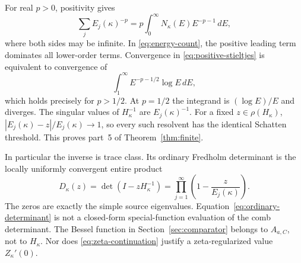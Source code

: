 For real $p>0$, positivity gives
\begin{equation}
\sum_jE_j(\kappa)^{-p}
=p\int_0^\infty N_\kappa(E)E^{-p-1}\,dE,
\label{eq:positive-stieltjes}
\end{equation}
where both sides may be infinite.
In \eqref{eq:energy-count}, the positive leading term
dominates all lower-order terms.
Convergence in \eqref{eq:positive-stieltjes} is equivalent
to convergence of
\[
\int_1^\infty E^{-p-1/2}\log E\,dE,
\]
which holds precisely for $p>1/2$.
At $p=1/2$ the integrand is $(\log E)/E$ and diverges.
The singular values of $H_\kappa^{-1}$ are
$E_j(\kappa)^{-1}$.
For a fixed $z\in\rho(H_\kappa)$,
$|E_j(\kappa)-z|/E_j(\kappa)\to1$,
so every such resolvent has the identical Schatten threshold.
This proves part~5 of Theorem~\ref{thm:finite}.

In particular the inverse is trace class.
Its ordinary Fredholm determinant is the locally uniformly
convergent entire product
\begin{equation}
D_\kappa(z)=\det(I-zH_\kappa^{-1})
           =\prod_{j=1}^\infty
                    \left(1-\frac{z}{E_j(\kappa)}\right).
\label{eq:ordinary-determinant}
\end{equation}
The zeros are exactly the simple source eigenvalues.
Equation~\eqref{eq:ordinary-determinant} is not a closed-form
special-function evaluation of the comb determinant.
The Bessel function in Section~\ref{sec:comparator}
belongs to $A_{a,C}$, not to $H_\kappa$.
Nor does \eqref{eq:zeta-continuation} justify a
zeta-regularized value $Z_\kappa'(0)$.
